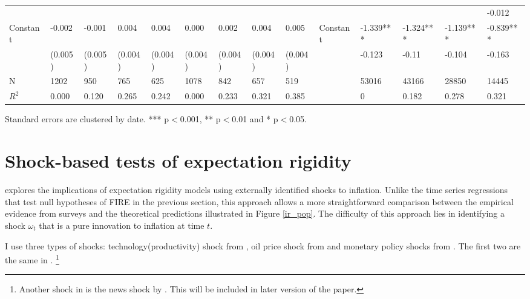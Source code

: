 \documentclass[]{article}
\begin{document}
\begin{table}
\begin{adjustbox}{width={24cm},totalheight={14cm}}
\begin{threeparttable}
\begin{tabular}{llllllllllllll}
					&             &           &           &           &               &           &           &           &                      &               &           &           & -0.012    \\
					Constant               & -0.002      & -0.001    & 0.004     & 0.004     & 0.000         & 0.002     & 0.004     & 0.005     &   Constant                   & -1.339***     & -1.324*** & -1.139*** & -0.839*** \\
					& (0.005)     & (0.005)   & (0.004)   & (0.004)   & (0.004)       & (0.004)   & (0.004)   & (0.004)   &                      & -0.123        & -0.11     & -0.104    & -0.163    \\
					\hline 
					N                    & 1202        & 950       & 765       & 625       & 1078          & 842       & 657       & 519       &                      & 53016         & 43166     & 28850     & 14445     \\
					$R^2$ & 0.000       & 0.120     & 0.265     & 0.242     & 0.000         & 0.233     & 0.321     & 0.385     &                      & 0             & 0.182     & 0.278     & 0.321  \\
					\hline    
				\end{tabular}
				\begin{tablenotes}
					\item Standard errors are clustered by date. *** p$<$0.001, ** p$<$0.01 and * p$<$0.05.
				\end{tablenotes}
			\end{threeparttable}
		\end{adjustbox}
	\end{table}
	
	\section{Shock-based tests of expectation rigidity }\label{ShockBased}
	
	\citet{coibion2012can} explores the implications of expectation rigidity models using externally identified shocks to inflation.  Unlike the time series regressions that test null hypotheses of FIRE in the previous section, this approach allows a more straightforward comparison between the empirical evidence from surveys and the theoretical predictions illustrated in Figure \ref{ir_pop}. The difficulty of this approach lies in identifying a shock $\omega_t$ that is a pure innovation to inflation at time $t$. 
	
	I use three types of shocks: technology(productivity) shock from \citet{gali1999technology}, oil price shock from \citet{hamilton1996happened} and monetary policy shocks from  \citet{laseen2011anticipated}. The first two are the same in \citet{coibion2012can}. \footnote{ Another shock in \citet{coibon2012can} is the news shock by \citet{barsky2011news}. This will be included in later version of the paper.} 
	
\end{document}

